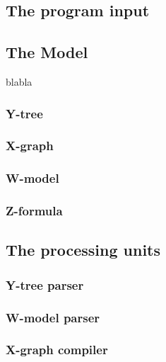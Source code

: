 \subsection{The program input}
\label{ch:impl:input}


\subsection{The Model}
\label{ch:impl:model}
blabla

\subsubsection{Y-tree}
\label{ch:impl:model:ytree}

\subsubsection{X-graph}
\label{ch:impl:model:xgraph}

\subsubsection{W-model}
\label{ch:impl:model:wmodel}

\subsubsection{Z-formula}
\label{ch:impl:model:zformula}

\subsection{The processing units} %
\label{ch:impl:proc}

\subsubsection{Y-tree parser}
\label{ch:impl:proc:y-parser}

\subsubsection{W-model parser}
\label{ch:impl:proc:w-parser}

\subsubsection{X-graph compiler}
\label{ch:impl:proc:x-compiler}

